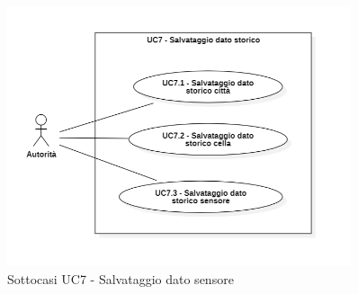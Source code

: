 \documentclass{article}
\begin{document}
\begin{figure}[H]
    \centering
    \includegraphics[width=0.9\textwidth]{Images/uc7_Subcase.PNG}
    \caption{Sottocasi UC7 - Salvataggio dato sensore}
    \label{fig:UC7_sub}
\end{figure}
\end{document}

